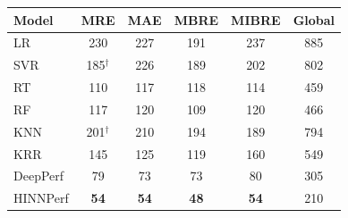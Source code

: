 \begin{tabular}{lccccc}
\toprule
Model & MRE & MAE & MBRE & MIBRE & Global \\
\midrule
LR & 230 & 227 & 191 & 237 & 885 \\
SVR & 185$^\dagger$ & 226 & 189 & 202 & 802 \\
RT & 110 & 117 & 118 & 114 & 459 \\
RF & 117 & 120 & 109 & 120 & 466 \\
KNN & 201$^\dagger$ & 210 & 194 & 189 & 794 \\
KRR & 145 & 125 & 119 & 160 & 549 \\
DeepPerf & 79 & 73 & 73 & 80 & 305 \\
HINNPerf & \textbf{54} & \textbf{54} & \textbf{48} & \textbf{54} & 210 \\
\bottomrule
\end{tabular}
